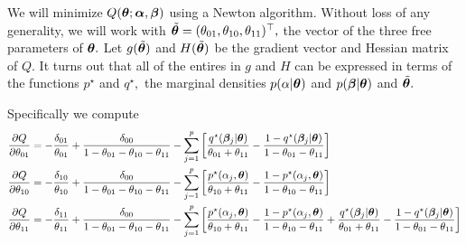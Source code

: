 We will minimize $Q(\boldsymbol{\theta};\boldsymbol{\alpha}, \boldsymbol{\beta})$ using a Newton algorithm.
Without loss of any generality, we will work with $\tilde{\boldsymbol{\theta}} = (\theta_{01}, \theta_{10}, \theta_{11})^{\top},$ the vector of the three free parameters of $\boldsymbol{\theta}.$
Let $g(\tilde{\boldsymbol{\theta}})$ and $H(\tilde{\boldsymbol{\theta}})$ be the gradient vector and Hessian matrix of $Q.$
It turns out that all of the entires in $g$ and $H$ can be expressed in terms of the functions $p^{\star}$ and $q^{\star},$ the marginal densities $p(\alpha \vert \boldsymbol{\theta})$ and $p(\boldsymbol{\beta} \vert \boldsymbol{\theta})$ and $\tilde{\boldsymbol{\theta}}.$

Specifically we compute
\begin{align*}
\frac{\partial Q}{\partial \theta_{01}} &= -\frac{\delta_{01}}{\theta_{01}} + \frac{\delta_{00}}{1 - \theta_{01} - \theta_{10} - \theta_{11}} - \sum_{j = 1}^{p}{\left[\frac{q^{\star}(\boldsymbol{\beta}_{j}\vert\boldsymbol{\theta})}{\theta_{01} + \theta_{11}} - \frac{1 - q^{\star}(\boldsymbol{\beta}_{j}\vert \boldsymbol{\theta})}{1 - \theta_{01} - \theta_{11}}\right]} \\
\frac{\partial Q}{\partial \theta_{10}} &= -\frac{\delta_{10}}{\theta_{10}} + \frac{\delta_{00}}{1 - \theta_{01} - \theta_{10} - \theta_{11}} - \sum_{j = 1}^{p}{\left[\frac{p^{\star}(\alpha_{j}, \boldsymbol{\theta})}{\theta_{10} + \theta_{11}} - \frac{1 - p^{\star}(\alpha_{j}, \boldsymbol{\theta})}{1 - \theta_{10} - \theta_{11}}\right]} \\
\frac{\partial Q}{\partial \theta_{11}} &= -\frac{\delta_{11}}{\theta_{11}} + \frac{\delta_{00}}{1 - \theta_{01} - \theta_{10} - \theta_{11}} - \sum_{j = 1}^{p}{\left[\frac{p^{\star}(\alpha_{j}, \boldsymbol{\theta})}{\theta_{10} + \theta_{11}} - \frac{1 - p^{\star}(\alpha_{j}, \boldsymbol{\theta})}{1 - \theta_{10} - \theta_{11}} + \frac{q^{\star}(\boldsymbol{\beta}_{j}\vert\boldsymbol{\theta})}{\theta_{01} + \theta_{11}} - \frac{1 - q^{\star}(\boldsymbol{\beta}_{j}\vert \boldsymbol{\theta})}{1 - \theta_{01} - \theta_{11}}\right]}
\end{align*}



